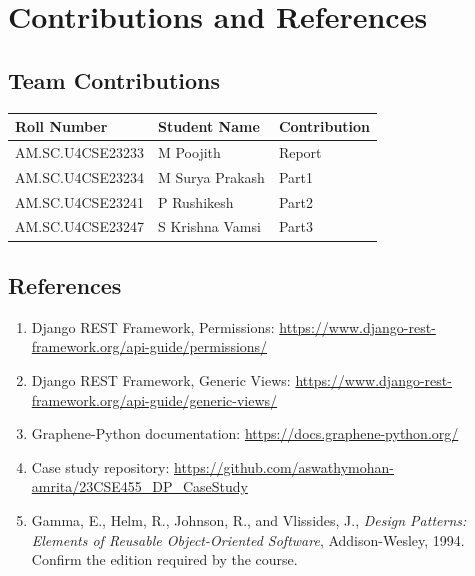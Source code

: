 \documentclass[11pt,a4paper]{article}
\begin{document}
\section{Contributions and References}

\subsection{Team Contributions}

\begin{tabularx}{\linewidth}{@{}lXl@{}}
\toprule
Roll Number & Student Name & Contribution\\
\midrule
AM.SC.U4CSE23233 & M Poojith & Report\\
AM.SC.U4CSE23234 & M Surya Prakash & Part1\\
AM.SC.U4CSE23241 & P Rushikesh & Part2\\
AM.SC.U4CSE23247 & S Krishna Vamsi & Part3\\
\bottomrule
\end{tabularx}

\subsection{References}

\begin{enumerate}[leftmargin=*]
    \item Django REST Framework, Permissions:
    \url{https://www.django-rest-framework.org/api-guide/permissions/}

    \item Django REST Framework, Generic Views:
    \url{https://www.django-rest-framework.org/api-guide/generic-views/}

    \item Graphene-Python documentation:
    \url{https://docs.graphene-python.org/}

    \item Case study repository:
    \url{https://github.com/aswathymohan-amrita/23CSE455_DP_CaseStudy}

    \item Gamma, E., Helm, R., Johnson, R., and Vlissides, J.,
    \textit{Design Patterns: Elements of Reusable Object-Oriented Software},
    Addison-Wesley, 1994. Confirm the edition required by the course.
\end{enumerate}
\end{document}
